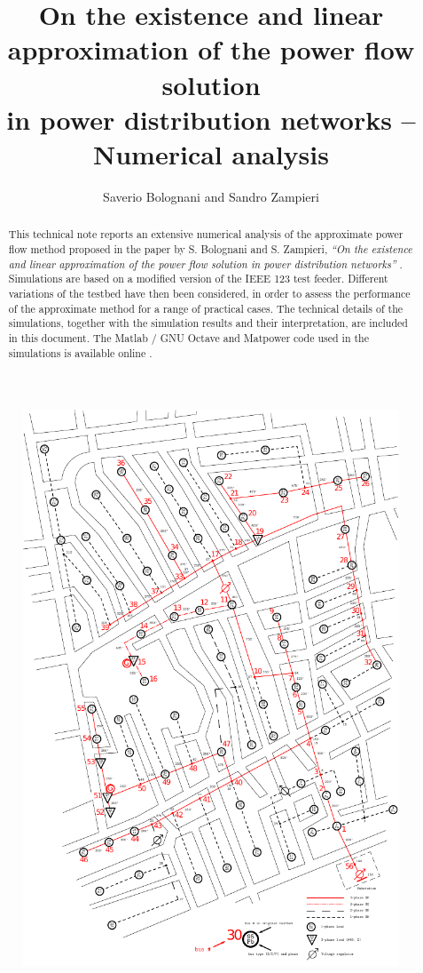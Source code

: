 \documentclass[10pt,letterpaper]{article}
\begin{document}
\title{On the existence and linear approximation of the power flow solution\\
in power distribution networks -- Numerical analysis}
\author{Saverio Bolognani and Sandro Zampieri}

\maketitle

\begin{abstract}
This technical note reports an extensive numerical analysis of the approximate power flow method proposed in the paper by S. Bolognani and S. Zampieri, \textit{``On the existence and linear approximation of the power flow solution in power distribution networks''} \cite{Bolognani_powerflow}. Simulations are based on a modified version of the IEEE 123 test feeder. Different variations of the testbed have then been considered, in order to assess the performance of the approximate method for a range of practical cases. The technical details of the simulations, together with the simulation results and their interpretation, are included in this document. The Matlab / GNU Octave \cite{octave} and Matpower \cite{Zimmerman2011} code used in the simulations is available online \cite{github_approx-pf}.
\end{abstract}

\begin{figure}
\centering
\includegraphics[height=\textheight]{ieee123}
\end{figure}
\end{document}
